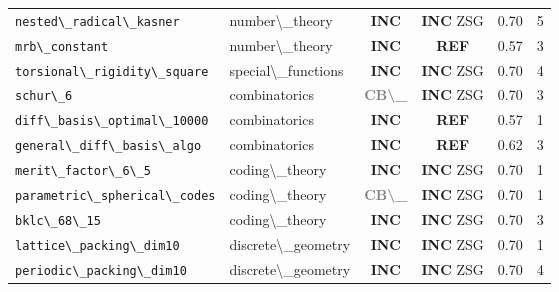 \documentclass[12pt,a4paper]{article}
\begin{document}
\begin{longtable}{llcccc}
  \texttt{nested\textbackslash{}_radical\textbackslash{}_kasner} & number\textbackslash{}_theory & \textcolor{incompleteamber}{\textbf{INC}} & \textcolor{incompleteamber}{\textbf{INC}}  \textcolor{sorryred}{ZSG} & 0.70 & 5 \\
  \texttt{mrb\textbackslash{}_constant} & number\textbackslash{}_theory & \textcolor{incompleteamber}{\textbf{INC}} & \textcolor{refutedred}{\textbf{REF}}  & 0.57 & 3 \\
  \texttt{torsional\textbackslash{}_rigidity\textbackslash{}_square} & special\textbackslash{}_functions & \textcolor{incompleteamber}{\textbf{INC}} & \textcolor{incompleteamber}{\textbf{INC}}  \textcolor{sorryred}{ZSG} & 0.70 & 4 \\
  \texttt{schur\textbackslash{}_6} & combinatorics & \textcolor{gray}{\textbf{CB\textbackslash{}_}} & \textcolor{incompleteamber}{\textbf{INC}}  \textcolor{sorryred}{ZSG} & 0.70 & 3 \\
  \texttt{diff\textbackslash{}_basis\textbackslash{}_optimal\textbackslash{}_10000} & combinatorics & \textcolor{incompleteamber}{\textbf{INC}} & \textcolor{refutedred}{\textbf{REF}}  & 0.57 & 1 \\
  \texttt{general\textbackslash{}_diff\textbackslash{}_basis\textbackslash{}_algo} & combinatorics & \textcolor{incompleteamber}{\textbf{INC}} & \textcolor{refutedred}{\textbf{REF}}  & 0.62 & 3 \\
  \texttt{merit\textbackslash{}_factor\textbackslash{}_6\textbackslash{}_5} & coding\textbackslash{}_theory & \textcolor{incompleteamber}{\textbf{INC}} & \textcolor{incompleteamber}{\textbf{INC}}  \textcolor{sorryred}{ZSG} & 0.70 & 1 \\
  \texttt{parametric\textbackslash{}_spherical\textbackslash{}_codes} & coding\textbackslash{}_theory & \textcolor{gray}{\textbf{CB\textbackslash{}_}} & \textcolor{incompleteamber}{\textbf{INC}}  \textcolor{sorryred}{ZSG} & 0.70 & 1 \\
  \texttt{bklc\textbackslash{}_68\textbackslash{}_15} & coding\textbackslash{}_theory & \textcolor{incompleteamber}{\textbf{INC}} & \textcolor{incompleteamber}{\textbf{INC}}  \textcolor{sorryred}{ZSG} & 0.70 & 3 \\
  \texttt{lattice\textbackslash{}_packing\textbackslash{}_dim10} & discrete\textbackslash{}_geometry & \textcolor{incompleteamber}{\textbf{INC}} & \textcolor{incompleteamber}{\textbf{INC}}  \textcolor{sorryred}{ZSG} & 0.70 & 1 \\
  \texttt{periodic\textbackslash{}_packing\textbackslash{}_dim10} & discrete\textbackslash{}_geometry & \textcolor{incompleteamber}{\textbf{INC}} & \textcolor{incompleteamber}{\textbf{INC}}  \textcolor{sorryred}{ZSG} & 0.70 & 4 \\

\end{longtable}
\end{document}
